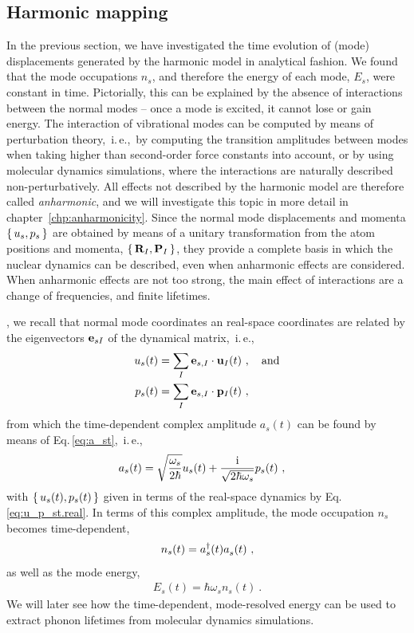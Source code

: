 \subsection{Harmonic mapping}
In the previous section, we have investigated the time evolution of (mode) displacements generated by the harmonic model in analytical fashion. We found that the mode occupations $n_s$, and therefore the energy of each mode, $E_s$, were constant in time. Pictorially, this can be explained by the absence of interactions between the normal modes -- once a mode is excited, it cannot lose or gain energy.
The interaction of vibrational modes can be computed by means of perturbation theory,~i.\,e.,~by computing the transition amplitudes between modes when taking higher than second-order force constants into account, or by using molecular dynamics simulations, where the interactions are naturally described non-perturbatively. All effects not described by the harmonic model are therefore called \emph{anharmonic}, and we will investigate this topic in more detail in chapter~\ref{chp:anharmonicity}. 
Since the normal mode displacements and momenta $\set{u_s, p_s}$ are obtained by means of a unitary transformation from the atom positions and momenta, $\set{{\bf R}_I, {\bf P}_I}$, they provide a complete basis in which the nuclear dynamics can be described, even when anharmonic effects are considered. When anharmonic effects are not too strong, the main effect of interactions are a change of frequencies, and finite lifetimes.

, we recall that normal mode coordinates an real-space coordinates are related by the eigenvectors ${\bf e}_{sI}$ of the dynamical matrix,~i.\,e.,
\begin{subequations}
	\label{eq:u_p_st.real}
\begin{align}
u_s (t)
&= \sum_{I} {\bf e}_{s, I} \cdot {\bf u}_{I} (t)
~,\quad\text{and}
\label{eq:u_st.real)} \\
p_s (t)
&=\sum_{I} {\bf e}_{s, I} \cdot {\bf p}_{I} (t) ~,
\label{eq:p_st.real}
\end{align}
\end{subequations}
from which the time-dependent complex amplitude $a_s (t)$ can be found by means of Eq.\,\eqref{eq:a_st},~i.\,e.,
\begin{align}
		a_s (t)
		&= \sqrt{\frac{\omega_s}{2 \hbar}} u_s (t) + \frac{{\rm i}}{\sqrt{2 \hbar \omega_s}} p_s (t)~,
\end{align}
with $\set{u_s (t), p_s (t)}$ given in terms of the real-space dynamics by Eq.\,\eqref{eq:u_p_st.real}. In terms of this complex amplitude, the mode occupation $n_s$ becomes time-dependent,
\begin{align}
	n_s (t) = \D a_s (t) \fD a_s (t)~,
	\label{eq:n_s(t)}
\end{align}
as well as the mode energy,
\begin{align}
	E_s (t) = \hbar \omega_s n_s (t)~.
\end{align}
We will later see how the time-dependent, mode-resolved energy can be used to extract phonon lifetimes from molecular dynamics simulations.

